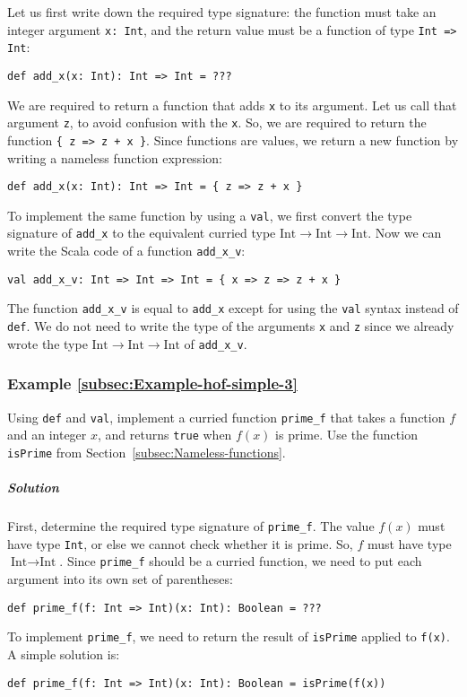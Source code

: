 Let us first write down the required type signature: the function
must take an integer argument \lstinline!x: Int!, and the return
value must be a function of type \lstinline!Int => Int!:
\begin{lstlisting}
def add_x(x: Int): Int => Int = ???
\end{lstlisting}
We are required to return a function that adds \lstinline!x! to its
argument. Let us call that argument \lstinline!z!, to avoid confusion
with the \lstinline!x!. So, we are required to return the function
\lstinline!{ z => z + x }!. Since functions are values, we return
a new function by writing a nameless function expression:
\begin{lstlisting}
def add_x(x: Int): Int => Int = { z => z + x }
\end{lstlisting}
To implement the same function by using a \lstinline!val!, we first
convert the type signature of \lstinline!add_x! to the equivalent
curried type $\text{Int}\rightarrow\text{Int}\rightarrow\text{Int}$.
Now we can write the Scala code of a function \lstinline!add_x_v!:
\begin{lstlisting}
val add_x_v: Int => Int => Int = { x => z => z + x }
\end{lstlisting}
The function \lstinline!add_x_v! is equal to \lstinline!add_x! except
for using the \lstinline!val! syntax instead of \lstinline!def!.
We do not need to write the type of the arguments \lstinline!x! and
\lstinline!z! since we already wrote the type $\text{Int}\rightarrow\text{Int}\rightarrow\text{Int}$
of \lstinline!add_x_v!. 

\subsubsection{Example \label{subsec:Example-hof-simple-3}\ref{subsec:Example-hof-simple-3}}

Using \lstinline!def! and \lstinline!val!, implement a curried function
\lstinline!prime_f! that takes a function $f$ and an integer $x$,
and returns \lstinline!true! when $f(x)$ is prime. Use the function
\lstinline!isPrime! from Section~\ref{subsec:Nameless-functions}. 

\subparagraph{Solution}

First, determine the required type signature of \lstinline!prime_f!.
The value $f(x)$ must have type \lstinline!Int!, or else we cannot
check whether it is prime. So, $f$ must have type $\text{Int}\rightarrow\text{Int}$.
Since \lstinline!prime_f! should be a curried function, we need to
put each argument into its own set of parentheses:
\begin{lstlisting}
def prime_f(f: Int => Int)(x: Int): Boolean = ???
\end{lstlisting}
To implement \lstinline!prime_f!, we need to return the result of
\lstinline!isPrime! applied to \lstinline!f(x)!. A simple solution
is:
\begin{lstlisting}
def prime_f(f: Int => Int)(x: Int): Boolean = isPrime(f(x))
\end{lstlisting}

